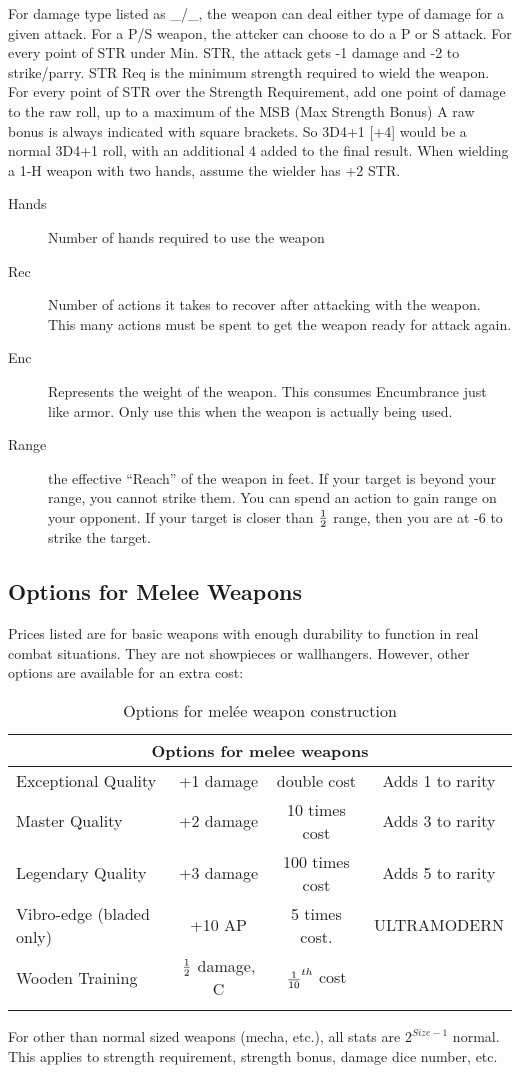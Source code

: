 For damage type listed as _/_, the weapon can deal either type of
damage for a given attack.  For a P/S weapon, the attcker can choose
to do a P or S attack. For every point of STR under Min. STR, the
attack gets -1 damage and -2 to strike/parry. STR Req is the minimum
strength required to wield the weapon. For every point of STR over the
Strength Requirement, add one point of damage to the raw roll, up to a
maximum of the MSB (Max Strength Bonus) A raw bonus is always
indicated with square brackets.  So 3D4+1 [+4] would be a normal 3D4+1
roll, with an additional 4 added to the final result. When wielding a
1-H weapon with two hands, assume the wielder has +2 STR.

\begin{description}
\item[Hands] Number of hands required to use the weapon
\item[Rec] Number of actions it takes to recover after attacking with
  the weapon.  This many actions must be spent to get the weapon ready
  for attack again.
\item[Enc] Represents the weight of the weapon.  This consumes
  Encumbrance just like armor.  Only use this when the weapon is
  actually being used.
\item[Range] the effective ``Reach'' of the weapon in feet.  If your
  target is beyond your range, you cannot strike them. You can spend
  an action to gain range on your opponent. If your target is closer
  than $1\over2$ range, then you are at -6 to strike the target.
\end{description}

\subsection{Options for Melee Weapons}
Prices listed are for basic weapons with enough durability to function
in real combat situations.  They are not showpieces or wallhangers.
However, other options are available for an extra cost:

\begin{longtable}{l|ccc}
\multicolumn{4}{c}{Options for melee weapons} \\
\hline
\endfirsthead
Exceptional Quality & +1 damage & double cost & Adds 1 to rarity \\
Master Quality & +2 damage & 10 times cost & Adds 3 to rarity \\	
Legendary Quality & +3 damage & 100 times cost & Adds 5 to rarity \\		
Vibro-edge (bladed only) & +10 AP & 5 times cost. & 	ULTRAMODERN \\
Wooden Training & $1\over2$ damage, C	& ${1\over{10}}^{th}$ cost \\
\caption{Options for mel\'{e}e weapon construction} \\
\end{longtable}


For other than normal sized weapons (mecha, etc.), all stats are
$2^{Size-1}$ normal.  This applies to strength requirement, strength
bonus, damage dice number, etc.

